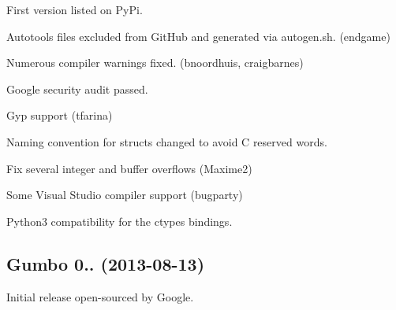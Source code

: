 \begin{DoxyItemize}
\item First version listed on Py\+Pi.
\item Autotools files excluded from Git\+Hub and generated via autogen.\+sh. (endgame)
\item Numerous compiler warnings fixed. (bnoordhuis, craigbarnes)
\item Google security audit passed.
\item Gyp support (tfarina)
\item Naming convention for structs changed to avoid C reserved words.
\item Fix several integer and buffer overflows (Maxime2)
\item Some Visual Studio compiler support (bugparty)
\item Python3 compatibility for the ctypes bindings.
\end{DoxyItemize}

\subsection*{Gumbo 0.. (2013-\/08-\/13)}


\begin{DoxyItemize}
\item Initial release open-\/sourced by Google. 
\end{DoxyItemize}